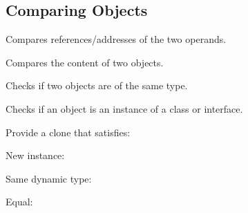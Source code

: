 \begin{figure}[H]	
  \centering
    \resizebox{\linewidth}{!}{\tikzset{font=\Huge}}
\end{figure}
\subsection{Comparing Objects}
\begin{defnbox}\nospacing
  \begin{defn}[\javainline{obj1==obj2}]
    Compares references/addresses of the two operands.\\
  \end{defn}
\end{defnbox}
\begin{defnbox}\nospacing
  \begin{defn}
    Compares the content of two objects.
  \end{defn}
\end{defnbox}
\begin{defnbox}\nospacing
  \begin{defn}[\javainline{obj1.getClass()==obj2.getClass()}]\label{defn:}
    Checks if two objects are of the same  type.
  \end{defn}
\end{defnbox}
\begin{defnbox}\nospacing
  \begin{defn}
    Checks if an object is an instance of a class or interface.
  \end{defn}
\end{defnbox}
\begin{intentbox}
  Provide a clone that satisfies:
  \begin{itemizenosep}
      \item New instance: 
      \item Same dynamic type: 
      \item Equal: 
  \end{itemizenosep}
\end{intentbox}
